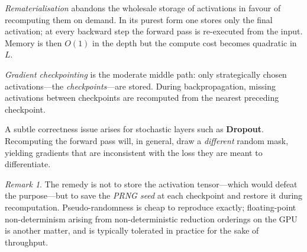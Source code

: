 \documentclass[11pt,a4paper]{article}
\theoremstyle{definition}
\theoremstyle{remark}
\newtheorem*{remark}{Remark}
\theoremstyle{plain}
\begin{document}
\emph{Rematerialisation} abandons the wholesale storage of activations
in favour of recomputing them on demand. In its purest form one stores
only the final activation; at every backward step the forward pass is
re-executed from the input. Memory is then $O(1)$ in the depth but the
compute cost becomes quadratic in $L$.

\emph{Gradient checkpointing} is the moderate middle path: only
strategically chosen activations---the \emph{checkpoints}---are stored.
During backpropagation, missing activations between checkpoints are
recomputed from the nearest preceding checkpoint.

\begin{center}
\end{center}

A subtle correctness issue arises for stochastic layers such as
\textbf{Dropout}. Recomputing the forward pass will, in general, draw a
\emph{different} random mask, yielding gradients that are inconsistent
with the loss they are meant to differentiate.

\begin{remark}
The remedy is not to store the activation tensor---which would defeat the
purpose---but to save the \emph{PRNG seed} at each checkpoint and restore
it during recomputation. Pseudo-randomness is cheap to reproduce exactly;
floating-point non-determinism arising from non-deterministic reduction
orderings on the GPU is another matter, and is typically tolerated in
practice for the sake of throughput.
\end{remark}
\end{document}
